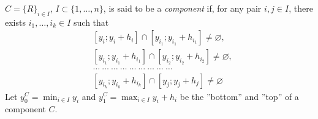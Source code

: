 \documentclass{article}
\theoremstyle{definition}
\theoremstyle{theorem}
\numberwithin{proposition}{section}
\begin{document}
        $C = \{R\}_{i\in I}$, $I \subset \{1,\dots,n\}$, is said to be a \textit{component} if, for any pair $i,j \in I$, there exists $i_1,\dots,i_k \in I$ such that
        \begin{equation*}
            \begin{aligned}
                &[y_i;y_i+h_i]\cap[y_{i_1};y_{i_1} +h_{i_1}] \neq \varnothing,\\
                &[y_{i_1};y_{i_1} +h_{i_1}]\cap[y_{i_2};y_{i_2} +h_{i_2}]\neq \varnothing,\\
                &\dots~\dots~\dots~\dots~\dots~\dots~\dots~\dots~\dots\\
                &[y_{i_k};y_{i_k} +h_{i_k}]\cap[y_{j};y_{j}+h_{j}]\neq \varnothing
            \end{aligned}
        \end{equation*} 
        Let $y_0^C = \displaystyle\min_{i\in I} y_i$ and $y_1^C = \displaystyle\max_{i\in I} y_i + h_i$ be the ''bottom'' and ''top'' of a component $C$.
\end{document}

